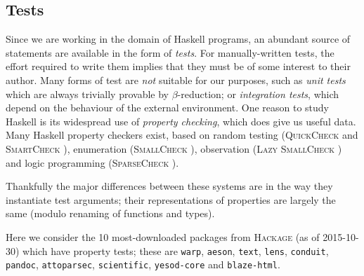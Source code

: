 \subsection{Tests} \label{sec:tests}


Since we are working in the domain of Haskell programs, an abundant source of
statements are available in the form of \emph{tests}. For manually-written
tests, the effort required to write them implies that they must be of some
interest to their author. Many forms of test are \emph{not} suitable for our
purposes, such as \emph{unit tests} which are always trivially provable by
$\beta$-reduction; or \emph{integration tests}, which depend on the behaviour of
the external environment. One reason to study Haskell is its widespread use of
\emph{property checking}, which does give us useful data. Many Haskell property
checkers exist, based on random testing (\textsc{QuickCheck}
\cite{claessen2011quickcheck} and \textsc{SmartCheck}
\cite{pike2014smartcheck}), enumeration (\textsc{SmallCheck}
\cite{runciman2008smallcheck}), observation (\textsc{Lazy SmallCheck}
\cite{reich2013advances}) and logic programming (\textsc{SparseCheck}
\cite{sparsecheck}).

Thankfully the major differences between these systems are in the way they
instantiate test arguments; their representations of properties are largely the
same (modulo renaming of functions and types).

Here we consider the 10 most-downloaded packages from \textsc{Hackage} (as of
2015-10-30) which have property tests; these are \texttt{warp}, \texttt{aeson},
\texttt{text}, \texttt{lens}, \texttt{conduit}, \texttt{pandoc},
\texttt{attoparsec}, \texttt{scientific}, \texttt{yesod-core} and
\texttt{blaze-html}.

